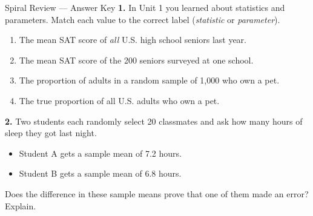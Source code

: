 \documentclass[10pt]{article}
\begin{document}
\namedateperiod

\vspace{0.15in}

\begin{notesbox}{Spiral Review --- Answer Key}
\textbf{1.} In Unit 1 you learned about statistics and parameters. Match each value to
the correct label (\emph{statistic} or \emph{parameter}).

\vspace{0.1in}
\begin{enumerate}[label=\alph*.]
  \item The mean SAT score of \emph{all} U.S. high school seniors last year.
        \hfill {}
  \item The mean SAT score of the 200 seniors surveyed at one school.
        \hfill {}
  \item The proportion of adults in a random sample of 1,000 who own a pet.
        \hfill {}
  \item The true proportion of all U.S. adults who own a pet.
        \hfill {}
\end{enumerate}

\vspace{0.15in}
\textbf{2.} Two students each randomly select 20 classmates and ask how many hours of
sleep they got last night.
\begin{itemize}
  \item Student A gets a sample mean of 7.2 hours.
  \item Student B gets a sample mean of 6.8 hours.
\end{itemize}

Does the difference in these sample means prove that one of them made an error?
Explain. 
\end{notesbox}
\end{document}
